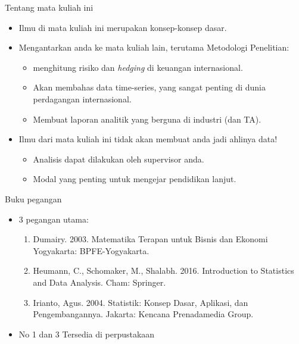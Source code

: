 \documentclass[
  ignorenonframetext,
]{beamer}
\begin{document}
\begin{frame}{Tentang mata kuliah ini}
\label{tentang-mata-kuliah-ini-2}
\begin{itemize}
\item
  Ilmu di mata kuliah ini merupakan konsep-konsep dasar.
\item
  Mengantarkan anda ke mata kuliah lain, terutama Metodologi Penelitian:

  \begin{itemize}
  \item
    menghitung risiko dan \emph{hedging} di keuangan internasional.
  \item
    Akan membahas data time-series, yang sangat penting di dunia
    perdagangan internasional.
  \item
    Membuat laporan analitik yang berguna di industri (dan TA).
  \end{itemize}
\item
  Ilmu dari mata kuliah ini tidak akan membuat anda jadi ahlinya data!

  \begin{itemize}
  \item
    Analisis dapat dilakukan oleh supervisor anda.
  \item
    Modal yang penting untuk mengejar pendidikan lanjut.
  \end{itemize}
\end{itemize}
\end{frame}

\begin{frame}{Buku pegangan}
\label{buku-pegangan}
\begin{itemize}
\item
  3 pegangan utama:

  \begin{enumerate}
  \item
    Dumairy. 2003. Matematika Terapan untuk Bisnis dan Ekonomi
    Yogyakarta: BPFE-Yogyakarta.
  \item
    Heumann, C., Schomaker, M., Shalabh. 2016. Introduction to
    Statistics and Data Analysis. Cham: Springer.
  \item
    Irianto, Agus. 2004. Statistik: Konsep Dasar, Aplikasi, dan
    Pengembangannya. Jakarta: Kencana Prenadamedia Group.
  \end{enumerate}
\item
  No 1 dan 3 Tersedia di perpustakaan
\end{itemize}
\end{frame}
\end{document}
